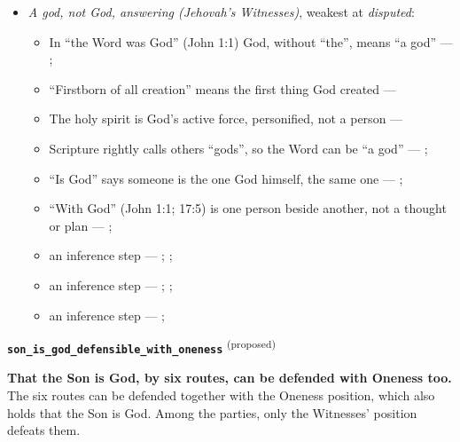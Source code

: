 \documentclass[11pt,paper=\testimonypaper,DIV=13,parskip=false]{scrartcl}
\begin{document}
\begin{itemize}
\item \emph{A god, not God, answering (Jehovah’s Witnesses)}, weakest at \emph{disputed}:
\begin{itemize}
\item In “the Word was God” (John 1:1) God, without “the”, means “a god” --- \cite[27]{watchtower-should-you-believe-trinity-1989}; \cite{new-world-translation-2013}
\item “Firstborn of all creation” means the first thing God created --- \cite[14]{watchtower-should-you-believe-trinity-1989}
\item The holy spirit is God’s active force, personified, not a person --- \cite[20--23]{watchtower-should-you-believe-trinity-1989}
\item Scripture rightly calls others “gods”, so the Word can be “a god” --- \cite[28]{watchtower-should-you-believe-trinity-1989}; \cite[31]{watchtower-questions-from-readers-1986}
\item “Is God” says someone is the one God himself, the same one --- \cite[ch. 8, Are Jesus and the Father One in Purpose Only?]{bernard-oneness-of-god-1983}; \cite[27]{watchtower-should-you-believe-trinity-1989}
\item “With God” (John 1:1; 17:5) is one person beside another, not a thought or plan --- \cite[3, The Triune God]{kibbey-living-systematic-theology-2026}; \cite[27]{watchtower-should-you-believe-trinity-1989}
\item an inference step --- \cite[28]{watchtower-should-you-believe-trinity-1989}; \cite[31]{watchtower-questions-from-readers-1986}; \cite[Origen, Against Celsus V.39]{roberts-ante-nicene-fathers-4-1885}
\item an inference step --- \cite[ch. 8, Are Jesus and the Father One in Purpose Only?]{bernard-oneness-of-god-1983}; \cite[27]{watchtower-should-you-believe-trinity-1989}; \cite[I, q. 28, a. 3]{aquinas-summa-1920}
\item an inference step --- \cite[23]{watchtower-should-you-believe-trinity-1989}; \cite[122--123]{roberts-christendom-astray}
\end{itemize}
\end{itemize}
\par\medskip\noindent\textbf{\texttt{son\_\allowbreak{}is\_\allowbreak{}god\_\allowbreak{}defensible\_\allowbreak{}with\_\allowbreak{}oneness}} \textsuperscript{(proposed)}\par\nobreak\noindent
\textbf{That the Son is God, by six routes, can be defended with Oneness too.} The six routes can be defended together with the Oneness position, which also holds that the Son is God. Among the parties, only the Witnesses’ position defeats them.
\end{document}
